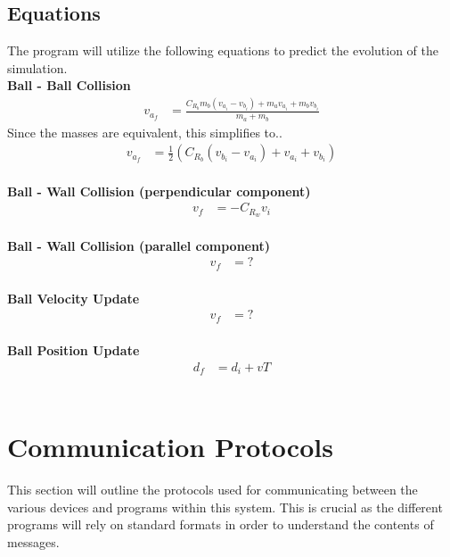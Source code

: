 \documentclass[titlepage]{article}
\begin{document}
\subsection{Equations}
The program will utilize the following equations to predict the evolution of the simulation.\\[4mm]
\textbf{Ball - Ball Collision}\\
{\large
\begin{align*}
	v_{a_f}	&= \frac{C_{R_b}m_b(v_{a_i} - v_{b_i}) + m_av_{a_i} + m_bv_{b_i}}{m_a + m_b}
\end{align*}
}
Since the masses are equivalent, this simplifies to..
{\large
\begin{align}
	v_{a_f}	&= \frac{1}{2}(C_{R_b}(v_{b_i} - v_{a_i}) + v_{a_i} + v_{b_i})
\end{align}
}\\
\textbf{Ball - Wall Collision (perpendicular component)}%
{\large
\begin{align}
	v_f	&= -C_{R_w}v_i
\end{align}
}\\
\textbf{Ball - Wall Collision (parallel component)}
{\large
\begin{align}
	v_f	&= ?%
\end{align}
}\\
\textbf{Ball Velocity Update}
{\large
\begin{align}
	v_f	&= ?%
\end{align}
}\\
\textbf{Ball Position Update}
{\large
\begin{align}
	d_f	&= d_i + vT
\end{align}
}\\



\section{Communication Protocols}
This section will outline the protocols used for communicating between the various devices and programs within this system. This is crucial as the different programs will rely on standard formats in order to understand the contents of messages.
\end{document}
